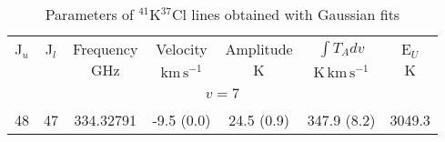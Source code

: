 \begin{table*}[htp]
\centering
\caption{Parameters of $^{41}$K$^{37}$Cl lines obtained with Gaussian fits}
\begin{tabular}{ccccccc}
\label{tab:41K37Cl_salt_lines}
 J$_u$ & J$_l$ & Frequency & Velocity & Amplitude & $\int T_A dv$ & E$_U$ \\
  &  & $\mathrm{GHz}$ & $\mathrm{km\,s^{-1}}$ & $\mathrm{K}$ & $\mathrm{K\,km\,s^{-1}}$ & $\mathrm{K}$ \\
\hline
&\vspace{-0.75em}\\
\multicolumn{7}{c}{$v = 7$} \\
\vspace{-0.75em}\\
 48 & 47 & 334.32791 & -9.5 (0.0) & 24.5 (0.9) & 347.9 (8.2) & 3049.3 \\
\hline
\end{tabular}

\par 
\end{table*}
